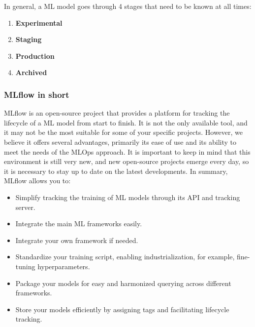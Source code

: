 In general, a ML model goes through 4 stages that need to be known at all times:

\begin{enumerate}
    \item \textbf{Experimental}
    \item \textbf{Staging}
    \item \textbf{Production}
    \item \textbf{Archived}
\end{enumerate}


\subsubsection{MLflow in short}

MLflow is an open-source project that provides a platform for tracking the lifecycle of a ML model from start to finish. It is not the only available tool, and it may not be the most suitable for some of your specific projects. However, we believe it offers several advantages, primarily its ease of use and its ability to meet the needs of the MLOps approach. It is important to keep in mind that this environment is still very new, and new open-source projects emerge every day, so it is necessary to stay up to date on the latest developments. In summary, MLflow allows you to:

\begin{itemize}
    \item Simplify tracking the training of ML models through its API and tracking server.
    \item Integrate the main ML frameworks easily.
    \item Integrate your own framework if needed.
    \item Standardize your training script, enabling industrialization, for example, fine-tuning hyperparameters.
    \item Package your models for easy and harmonized querying across different frameworks.
    \item Store your models efficiently by assigning tags and facilitating lifecycle tracking.
\end{itemize}

